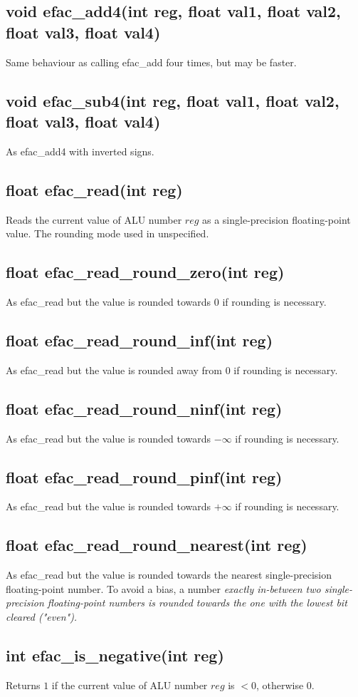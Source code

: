 \subsection{void efac\_add4(int reg, float val1, float val2, float val3, float val4)}
Same behaviour as calling efac\_add four times, but may be faster.
\subsection{void efac\_sub4(int reg, float val1, float val2, float val3, float val4)}
As efac\_add4 with inverted signs.
\subsection{float efac\_read(int reg)}
Reads the current value of ALU number $reg$ as a single-precision floating-point value.
The rounding mode used in unspecified.
\subsection{float efac\_read\_round\_zero(int reg)}
As efac\_read but the value is rounded towards $0$ if rounding is necessary.
\subsection{float efac\_read\_round\_inf(int reg)}
As efac\_read but the value is rounded away from $0$ if rounding is necessary.
\subsection{float efac\_read\_round\_ninf(int reg)}
As efac\_read but the value is rounded towards $-\infty$ if rounding is necessary.
\subsection{float efac\_read\_round\_pinf(int reg)}
As efac\_read but the value is rounded towards $+\infty$ if rounding is necessary.
\subsection{float efac\_read\_round\_nearest(int reg)}
As efac\_read but the value is rounded towards the nearest single-precision
floating-point number.
To avoid a bias, a number \em exactly \rm in-between two single-precision
floating-point numbers is rounded towards the one with the lowest bit
cleared ("even").
\subsection{int efac\_is\_negative(int reg)}
Returns $1$ if the current value of ALU number $reg$ is $< 0$, otherwise $0$.
